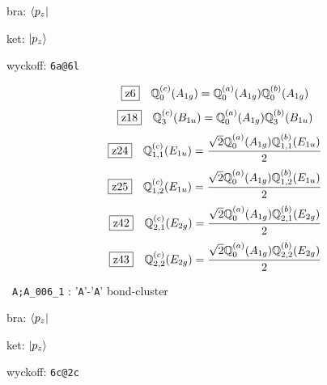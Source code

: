 \documentclass[fleqn,10pt,landscape]{jsarticle}
\begin{document}
\noindent\quad * bra: $\bra{p_{z}}$

\noindent\quad * ket: $\ket{p_{z}}$

\noindent\quad * wyckoff: \texttt{6a@6l}

\begin{dmath*}
\hspace*{3mm}\fbox{z6}\quad \mathbb{Q}_{0}^{(c)}(A_{1g})=\mathbb{Q}_{0}^{(a)}(A_{1g}) \mathbb{Q}_{0}^{(b)}(A_{1g})
\end{dmath*}
\begin{dmath*}
\hspace*{3mm}\fbox{z18}\quad \mathbb{Q}_{3}^{(c)}(B_{1u})=\mathbb{Q}_{0}^{(a)}(A_{1g}) \mathbb{Q}_{3}^{(b)}(B_{1u})
\end{dmath*}
\begin{dmath*}
\hspace*{3mm}\fbox{z24}\quad \mathbb{Q}_{1,1}^{(c)}(E_{1u})=\frac{\sqrt{2} \mathbb{Q}_{0}^{(a)}(A_{1g}) \mathbb{Q}_{1,1}^{(b)}(E_{1u})}{2}
\end{dmath*}
\begin{dmath*}
\hspace*{3mm}\fbox{z25}\quad \mathbb{Q}_{1,2}^{(c)}(E_{1u})=\frac{\sqrt{2} \mathbb{Q}_{0}^{(a)}(A_{1g}) \mathbb{Q}_{1,2}^{(b)}(E_{1u})}{2}
\end{dmath*}
\begin{dmath*}
\hspace*{3mm}\fbox{z42}\quad \mathbb{Q}_{2,1}^{(c)}(E_{2g})=\frac{\sqrt{2} \mathbb{Q}_{0}^{(a)}(A_{1g}) \mathbb{Q}_{2,1}^{(b)}(E_{2g})}{2}
\end{dmath*}
\begin{dmath*}
\hspace*{3mm}\fbox{z43}\quad \mathbb{Q}_{2,2}^{(c)}(E_{2g})=\frac{\sqrt{2} \mathbb{Q}_{0}^{(a)}(A_{1g}) \mathbb{Q}_{2,2}^{(b)}(E_{2g})}{2}
\end{dmath*}
\vspace{5mm}

\noindent\textbullet\, \texttt{A;A_006_1} : '\texttt{A}'-'\texttt{A}' bond-cluster

\noindent\quad * bra: $\bra{p_{z}}$

\noindent\quad * ket: $\ket{p_{z}}$

\noindent\quad * wyckoff: \texttt{6c@2c}
\end{document}
